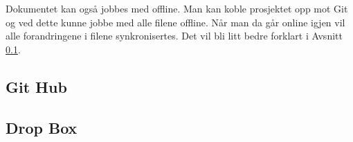 \hspace{-17pt}Dokumentet kan også jobbes med offline. Man kan koble prosjektet opp mot Git og ved dette kunne jobbe med alle filene offline. Når man da går online igjen vil alle forandringene i filene synkronisertes. Det vil bli litt bedre forklart i Avsnitt \ref{sec:git}.





\newpage

\subsection{Git Hub}
\label{sec:git}

\newpage

\subsection{Drop Box}


